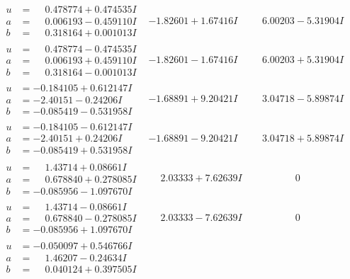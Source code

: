 \documentclass[1p]{elsarticle_modified}
\theoremstyle{definition}
\begin{document}
$$\begin{array}{c|c|c}
\begin{aligned}
u &= \phantom{-}0.478774 + 0.474535 I \\
a &= \phantom{-}0.006193 - 0.459110 I \\
b &= \phantom{-}0.318164 + 0.001013 I\end{aligned}
 & -1.82601 + 1.67416 I & \phantom{-}6.00203 - 5.31904 I \\ \hline\begin{aligned}
u &= \phantom{-}0.478774 - 0.474535 I \\
a &= \phantom{-}0.006193 + 0.459110 I \\
b &= \phantom{-}0.318164 - 0.001013 I\end{aligned}
 & -1.82601 - 1.67416 I & \phantom{-}6.00203 + 5.31904 I \\ \hline\begin{aligned}
u &= -0.184105 + 0.612147 I \\
a &= -2.40151 - 0.24206 I \\
b &= -0.085419 - 0.531958 I\end{aligned}
 & -1.68891 + 9.20421 I & \phantom{-}3.04718 - 5.89874 I \\ \hline\begin{aligned}
u &= -0.184105 - 0.612147 I \\
a &= -2.40151 + 0.24206 I \\
b &= -0.085419 + 0.531958 I\end{aligned}
 & -1.68891 - 9.20421 I & \phantom{-}3.04718 + 5.89874 I \\ \hline\begin{aligned}
u &= \phantom{-}1.43714 + 0.08661 I \\
a &= \phantom{-}0.678840 + 0.278085 I \\
b &= -0.085956 - 1.097670 I\end{aligned}
 & \phantom{-}2.03333 + 7.62639 I & \phantom{-0.000000 } 0 \\ \hline\begin{aligned}
u &= \phantom{-}1.43714 - 0.08661 I \\
a &= \phantom{-}0.678840 - 0.278085 I \\
b &= -0.085956 + 1.097670 I\end{aligned}
 & \phantom{-}2.03333 - 7.62639 I & \phantom{-0.000000 } 0 \\ \hline\begin{aligned}
u &= -0.050097 + 0.546766 I \\
a &= \phantom{-}1.46207 - 0.24634 I \\
b &= \phantom{-}0.040124 + 0.397505 I\end{aligned}

\end{array}$$
\end{document}
